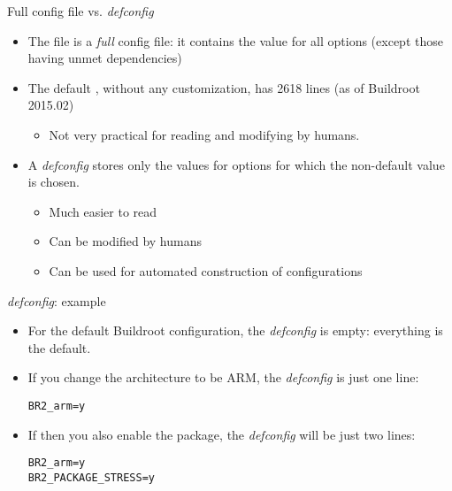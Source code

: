 \begin{frame}{Full config file vs. {\em defconfig}}
  \begin{itemize}
  \item The  file is a {\em full} config file: it
    contains the value for all options (except those having unmet
    dependencies)
  \item The default , without any customization, has
    2618 lines (as of Buildroot 2015.02)
    \begin{itemize}
    \item Not very practical for reading and modifying by humans.
    \end{itemize}
  \item A {\em defconfig} stores only the values for options for which
    the non-default value is chosen.
    \begin{itemize}
    \item Much easier to read
    \item Can be modified by humans
    \item Can be used for automated construction of configurations
    \end{itemize}
  \end{itemize}
\end{frame}

\begin{frame}[fragile]{{\em defconfig}: example}
  \begin{itemize}
  \item For the default Buildroot configuration, the {\em defconfig}
    is empty: everything is the default.
  \item If you change the architecture to be ARM, the {\em defconfig}
    is just one line:
{\small
\begin{block}{}
\begin{verbatim}
BR2_arm=y
\end{verbatim}
\end{block}
}
  \item If then you also enable the  package, the {\em
      defconfig} will be just two lines:
{\small
\begin{block}{}
\begin{verbatim}
BR2_arm=y
BR2_PACKAGE_STRESS=y
\end{verbatim}
\end{block}
}
  \end{itemize}
\end{frame}

